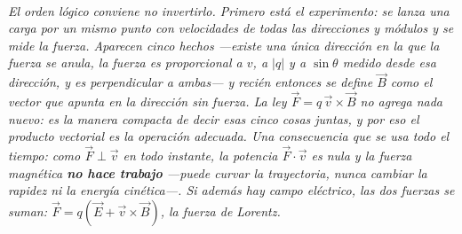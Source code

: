 \begin{center}
\begin{tikzpicture}[scale=1]
\end{tikzpicture}\\[0.5em]
{\small\itshape El orden lógico conviene no invertirlo. Primero está el
experimento: se lanza una carga por un mismo punto con velocidades de todas las
direcciones y módulos y se mide la fuerza. Aparecen cinco hechos ---existe una
única dirección en la que la fuerza se anula, la fuerza es proporcional a $v$, a
$|q|$ y a $\sin\theta$ medido desde esa dirección, y es perpendicular a ambas---
y recién entonces se \emph{define} $\vec B$ como el vector que apunta en la
dirección sin fuerza. La ley $\vec F = q\,\vec v\times\vec B$ no agrega nada
nuevo: es la manera compacta de decir esas cinco cosas juntas, y por eso el
producto vectorial es la operación adecuada. Una consecuencia que se usa todo el
tiempo: como $\vec F \perp \vec v$ en todo instante, la potencia
$\vec F\cdot\vec v$ es nula y la fuerza magnética \textbf{no hace trabajo}
---puede curvar la trayectoria, nunca cambiar la rapidez ni la energía
cinética---. Si además hay campo eléctrico, las dos fuerzas se suman:
$\vec F = q(\vec E + \vec v\times\vec B)$, la fuerza de Lorentz.}
\end{center}
